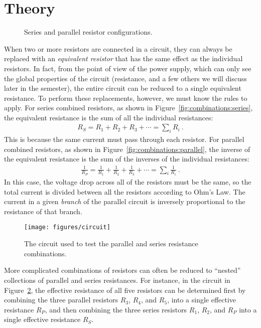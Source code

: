 \documentclass[12pt]{article}
\begin{document}
\section{Theory}
\label{sec:theory}

\begin{figure}
  \centering
     \qquad
  \caption{Series and parallel resistor configurations.}
  \label{fig:combinations}
\end{figure}
When two or more resistors are connected in a circuit, they can always
be replaced with an \textit{equivalent resistor} that has the same
effect as the individual resistors.  In fact, from the point of view
of the power supply, which can only see the global properties of the
circuit (resistance, and a few others we will discuss later in the
semester), the entire circuit can be reduced to a single equivalent
resistance.  To perform these replacements, however, we must know the
rules to apply.  For series combined resistors, as shown in
Figure~\ref{fig:combinations:series}, the equivalent resistance is the
sum of all the individual resistances:
\begin{gather*}
  R_S = R_1 + R_2 + R_3 + \cdots = \sum_i R_i\ .
\end{gather*}
This is because the same current must pass through each resistor.  For
parallel combined resistors, as shown in
Figure~\ref{fig:combinations:parallel}, the inverse of the equivalent
resistance is the sum of the inverses of the individual resistances:
\begin{gather*}
  \frac{1}{R_P } = \frac{1}{R_1} + \frac{1}{R_2} + \frac{1}{R_3} +
  \cdots = \sum_i \frac{1}{R_i}\ .
\end{gather*}
In this case, the voltage drop across all of the resistors must be the
same, so the total current is divided between all the resistors
according to Ohm's Law.  The current in a given \textit{branch} of the
parallel circuit is inversely proportional to the resistance of that
branch.

\begin{figure}
  \centering
  \texttt{[image: figures/circuit]}
  \caption{The circuit used to test the parallel and series resistance
    combinations.} 
  \label{fig:circuit}
\end{figure}
More complicated combinations of resistors can often be reduced to
``nested'' collections of parallel and series resistances.  For
instance, in the circuit in Figure~\ref{fig:circuit}, the effective
resistance of all five resistors can be determined first by combining
the three parallel resistors $R_3$, $R_4$, and $R_5$, into a single
effective resistance $R_P$, and then combining the three series
resistors $R_1$, $R_2$, and $R_P$ into a single effective resistance
$R_S$.
\end{document}
